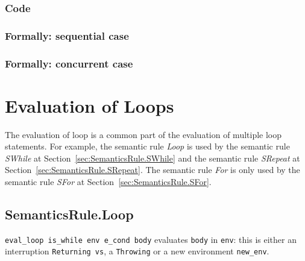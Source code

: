 \documentclass{book}
\begin{document}
  \subsection{Code}

\begin{emptyformal}
    \subsection{Formally: sequential case}

  \subsection{Formally: concurrent case}
\end{emptyformal}


\chapter{Evaluation of Loops \label{chap:eval_loops}}

The evaluation of loop is a common part of the evaluation of multiple loop
statements.
%
For example, the semantic rule \emph{Loop} is used by the semantic rule
\emph{SWhile} at Section~\ref{sec:SemanticsRule.SWhile} and the semantic rule
\emph{SRepeat} at Section~\ref{sec:SemanticsRule.SRepeat}.
%
The semantic rule \emph{For} is only used by the semantic rule \emph{SFor} at
Section~\ref{sec:SemanticsRule.SFor}.

\section{SemanticsRule.Loop \label{sec:SemanticsRule.Loop}}
\texttt{eval\_loop is\_while env e\_cond body} evaluates \texttt{body} in
\texttt{env}: this is either an interruption \texttt{Returning vs}, a
\texttt{Throwing} or a new environment \texttt{new\_env}.
\end{document}
